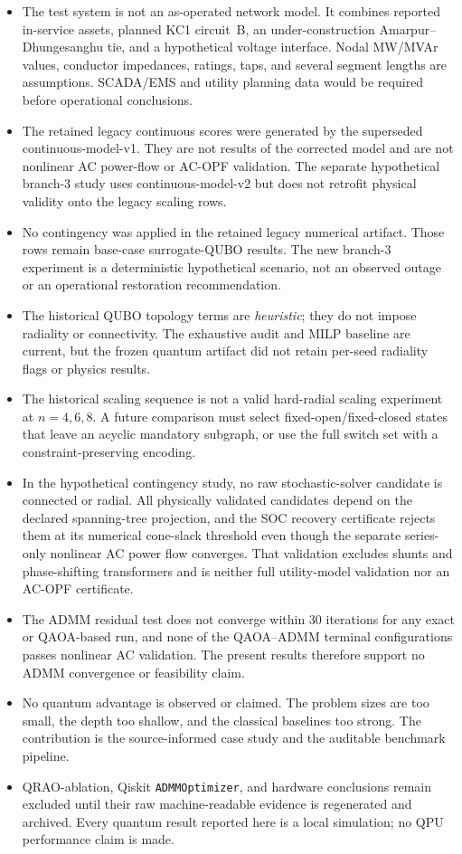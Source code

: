 \documentclass[5p,twocolumn,number,sort&compress,nopreprintline]{elsarticle}
\begin{document}
\begin{itemize}
\item The test system is not an as-operated network model. It combines
reported in-service assets, planned KC1 circuit~B, an under-construction
Amarpur--Dhungesanghu tie, and a hypothetical voltage interface.
Nodal MW/MVAr values, conductor impedances, ratings, taps, and several
segment lengths are assumptions. SCADA/EMS and utility planning data
would be required before operational conclusions.
\item The retained legacy continuous scores were generated by the
superseded continuous-model-v1. They are not results of the corrected
model and are not nonlinear AC power-flow or AC-OPF validation. The
separate hypothetical branch-3 study uses continuous-model-v2 but does
not retrofit physical validity onto the legacy scaling rows.
\item No contingency was applied in the retained legacy numerical
artifact. Those rows remain base-case surrogate-QUBO results. The new
branch-3 experiment is a deterministic hypothetical scenario, not an
observed outage or an operational restoration recommendation.
\item The historical QUBO topology terms are \emph{heuristic}; they
do not impose radiality or connectivity. The exhaustive audit and MILP
baseline are current, but the frozen quantum artifact did not retain
per-seed radiality flags or physics results.
\item The historical scaling sequence is not a valid hard-radial
scaling experiment at $n=4,6,8$. A future comparison must select
fixed-open/fixed-closed states that leave an acyclic mandatory subgraph,
or use the full switch set with a constraint-preserving encoding.
\item In the hypothetical contingency study, no raw stochastic-solver
candidate is connected or radial. All physically validated candidates
depend on the declared spanning-tree projection, and the SOC recovery
certificate rejects them at its numerical cone-slack threshold even
though the separate series-only nonlinear AC power flow converges. That
validation excludes shunts and phase-shifting transformers and is
neither full utility-model validation nor an AC-OPF certificate.
\item The ADMM residual test does not converge within 30 iterations for
any exact or QAOA-based run, and none of the QAOA--ADMM terminal
configurations passes nonlinear AC validation. The present results
therefore support no ADMM convergence or feasibility claim.
\item No quantum advantage is observed or claimed. The problem sizes
are too small, the depth too shallow, and the classical baselines
too strong. The contribution is the source-informed case study and the
auditable benchmark pipeline.
\item QRAO-ablation, Qiskit \texttt{ADMMOptimizer}, and hardware
conclusions remain excluded until their raw machine-readable evidence is
regenerated and archived. Every quantum result reported here is a local
simulation; no QPU performance claim is made.
\end{itemize}
\end{document}
